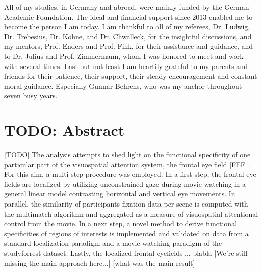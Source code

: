 \documentclass[a4paper, 12pt]{scrreprt}
\begin{document}
All of my studies, in Germany and abroad, were mainly funded by the German Academic Foundation. The ideal and financial support since 2013 enabled me to become the person I am today. I am thankful to all of my referees, Dr. Ludwig, Dr. Trebesius, Dr. Köhne, and Dr. Chwalleck, for the insightful discussions, and my mentors, Prof. Enders and Prof. Fink, for their assistance and guidance, and to Dr. Julius and Prof. Zimmermann, whom I was honored to meet and work with several times. \newline
Last but not least I am heartily grateful to my parents and friends for their patience, their support, their steady encouragement and constant moral guidance. Especially Gunnar Behrens, who was my anchor throughout seven busy years.


\clearpage

\setcounter{page}{1}	%


\chapter*{TODO: Abstract}

[TODO]     \newline
The analysis attempts to shed light on the functional specificity of one particular part of the visuospatial attention system, the frontal eye field [FEF]. For this aim, a multi-step procedure was employed. In a first step, the frontal eye fields are localized by utilizing unconstrained gaze during movie watching in a general linear model contrasting horizontal and vertical eye movements. In parallel, the similarity of participants fixation data per scene is computed with the multimatch algorithm and aggregated as a measure of visuospatial attentional control from the movie. In a next step, a novel method to derive functional specificities of regions of interests is implemented and validated on data from a standard localization paradigm and a movie watching paradigm of the studyforrest dataset. Lastly, the localized frontal eyefields ... blabla
[We're still missing the main approach here...]
[what was the main result] 
\end{document}
